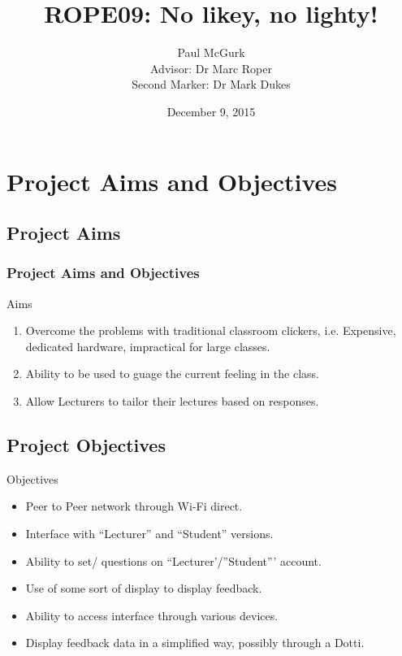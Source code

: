 \documentclass{beamer}
\title[ROPE09]{ROPE09: No likey, no lighty!} %
\author{Paul McGurk\\\medskip \footnotesize{Advisor: Dr Marc Roper\\
Second Marker: Dr Mark Dukes}} %
\institute[University of Strathclyde] %
{
University of Strathclyde \\ %
\medskip
\textit{paul@mcgurk.co\\} %
}
\date{December 9, 2015} %
\begin{document}
\begin{frame}
\titlepage %
\end{frame}


\section{Project Aims and Objectives}
\begin{frame}
\subsection{Project Aims}
\frametitle{Project Aims and Objectives}
\begin{block}{Aims}
\begin{enumerate}
	\item Overcome the problems with traditional classroom clickers, i.e. Expensive, dedicated hardware, impractical for large classes.
	\item Ability to be used to guage the current feeling in the class.
	\item Allow Lecturers to tailor their lectures based on responses.
\end{enumerate}
\end{block}
\subsection{Project Objectives}
\begin{block}{Objectives}
  \begin{itemize}
	\item Peer to Peer network through Wi-Fi direct.
	\item Interface with ``Lecturer'' and ``Student'' versions.
	\item Ability to set/ questions on ``Lecturer'/''Student''' account.
	\item Use of some sort of display to display feedback.
	\item Ability to access interface through various devices.
	\item Display feedback data in a simplified way, possibly through a Dotti.
\end{itemize}
\end{block}
\end{frame}
\end{document}
